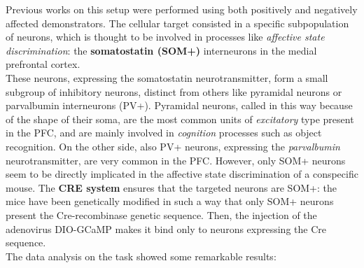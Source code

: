 \documentclass[12pt, a4paper]{report}
\begin{document}
Previous works on this setup \cite{8} %
 were performed using both positively and negatively affected demonstrators. The cellular target consisted in a specific subpopulation of neurons, which is thought to be involved in processes like \textit{affective state discrimination}: the \textbf{somatostatin (SOM+)} interneurons in the medial prefrontal cortex.\\
These neurons, expressing the somatostatin neurotransmitter, form a small
subgroup of inhibitory neurons, distinct from others like pyramidal neurons or parvalbumin interneurons (PV+). Pyramidal neurons, called in this way because of the shape of their soma, are the most common units of \textit{excitatory} type present in the PFC, and are mainly involved in \textit{cognition} processes such as object recognition. On the other side, also PV+ neurons, expressing the \textit{parvalbumin} neurotransmitter,  are  very common in the PFC. However, only SOM+ neurons seem to be directly implicated in the affective state discrimination of a conspecific mouse. The \textbf{CRE system} \cite{8} ensures that the targeted neurons are SOM+: the mice have been genetically modified in such a way that only SOM+ neurons present the Cre-recombinase genetic sequence. Then, the injection of the adenovirus DIO-GCaMP makes it bind only to neurons expressing the Cre sequence. \\
The data analysis on the task showed some remarkable results:
\end{document}
